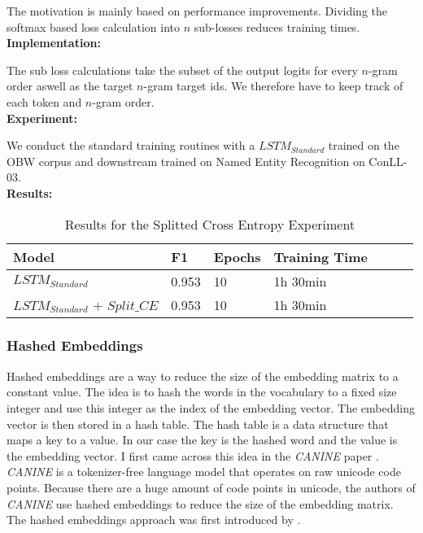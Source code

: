 \documentclass[11pt]{article}
\begin{document}
The motivation is mainly based on performance improvements. Dividing the softmax based loss calculation 
into $n$ sub-losses reduces training times.\\

\textbf{Implementation:}

The sub loss calculations take the subset of the output logits for every $n$-gram order aswell as the target $n$-gram 
target ids. We therefore have to keep track of each token and $n$-gram order.\\

\textbf{Experiment:}

We conduct the standard training routines with a $LSTM_{Standard}$ trained on the OBW corpus and downstream trained 
on Named Entity Recognition on ConLL-03.\\

\textbf{Results:}
\begin{table}[h]
  \centering
  \begin{tabular}{|l|l|l|l|l|l|l|}
    \hline
    Model                           & F1    & Epochs & Training Time \\ \hline
    $LSTM_{Standard}$               & 0.953 & 10     & 1h 30min \\ \hline
    $LSTM_{Standard}$ + $Split\_CE$ & 0.953 & 10     & 1h 30min \\ \hline
  \end{tabular}
  \caption{Results for the Splitted Cross Entropy Experiment}
  \label{tab:hashed-embeddings-hyperparameters}
\end{table}



\subsubsection{Hashed Embeddings}

Hashed embeddings are a way to reduce the size of the embedding matrix to a constant value.
The idea is to hash the words in the vocabulary to a fixed size integer
and use this integer as the index of the embedding vector. The embedding vector is then stored
in a hash table. The hash table is a data structure that maps a key to a value. In our case the
key is the hashed word and the value is the embedding vector.
I first came across this idea in the \textit{CANINE} paper \cite{clarkCANINEPretrainingEfficient2022a}.
\textit{CANINE} is a tokenizer-free language model that operates on raw unicode code points.
Because there are a huge amount of code points in unicode, the authors of \textit{CANINE} use
hashed embeddings to reduce the size of the embedding matrix. The hashed embeddings approach was
first introduced by \cite{svenstrupHashEmbeddingsEfficient2017}.\\
\end{document}
